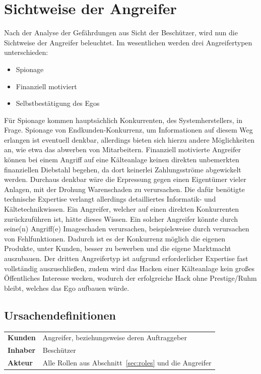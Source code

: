 \documentclass[11pt,a4paper]{report}
\begin{document}
\section{Sichtweise der Angreifer}

Nach der Analyse der Gefährdungen aus Sicht der Beschützer, wird nun die Sichtweise der Angreifer beleuchtet. Im wesentlichen werden drei Angreifertypen unterschieden:

\begin{itemize}[leftmargin=*]
\item Spionage
\item Finanziell motiviert
\item Selbstbestätigung des Egos
\end{itemize}

Für Spionage kommen hauptsächlich Konkurrenten, des Systemherstellers, in Frage. Spionage von Endkunden-Konkurrenz, um Informationen auf diesem Weg erlangen ist eventuell denkbar, allerdings bieten sich hierzu andere Möglichkeiten an, wie etwa das abwerben von Mitarbeitern. Finanziell motivierte Angreifer können bei einem Angriff auf eine Kälteanlage keinen direkten unbemerkten finanziellen Diebstahl begehen, da dort keinerlei Zahlungsströme abgewickelt werden. Durchaus denkbar wäre die Erpressung gegen einen Eigentümer vieler Anlagen, mit der Drohung Warenschaden zu verursachen. Die dafür benötigte technische Expertise verlangt allerdings detailliertes Informatik- und Kältetechnikwissen. Ein Angreifer, welcher auf einen direkten Konkurrenten zurückzuführen ist, hätte dieses Wissen. Ein solcher Angreifer könnte durch seine(n) Angriff(e) Imageschaden verursachen, beispielsweise durch verursachen von Fehlfunktionen. Dadurch ist es der Konkurrenz möglich die eigenen Produkte, unter Kunden, besser zu bewerben und die eigene Marktmacht auszubauen. Der dritten Angreifertyp ist aufgrund erforderlicher Expertise fast vollständig auszuschließen, zudem wird das Hacken einer Kälteanlage kein großes Öffentliches Interesse wecken, wodurch der erfolgreiche Hack ohne Prestige/Ruhm bleibt, welches das Ego aufbauen würde.

\subsection{Ursachendefinitionen}

\begin{table}[h] %
\begin{tabularx}{\linewidth}{@{}lX@{}}
\textbf{Kunden} & Angreifer, beziehungsweise deren Auftraggeber\\
\textbf{Inhaber} & Beschützer\\
\textbf{Akteur} & Alle Rollen aus Abschnitt~\ref{sec:roles} und die Angreifer\\
\end{tabularx}
\end{table}
\end{document}
